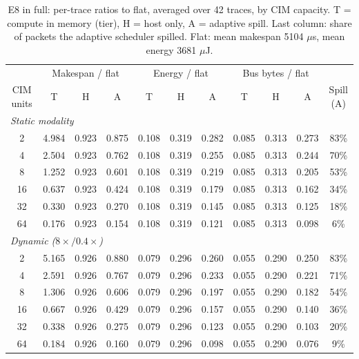 \begin{table}[h]
\centering\scriptsize\setlength{\tabcolsep}{3.2pt}
\caption{E8 in full: per-trace ratios to flat, averaged over 42 traces, by CIM capacity. T = compute in memory (tier), H = host only, A = adaptive spill. Last column: share of \warm{} packets the adaptive scheduler spilled. Flat: mean makespan 5104 $\mu$s, mean energy 3681 $\mu$J.}
\label{tab:e8full}
\begin{tabular}{c ccc ccc ccc c}
\toprule
 & \multicolumn{3}{c}{Makespan / flat} & \multicolumn{3}{c}{Energy / flat} & \multicolumn{3}{c}{Bus bytes / flat} & \\
\cmidrule(lr){2-4}\cmidrule(lr){5-7}\cmidrule(lr){8-10}
CIM units & T & H & A & T & H & A & T & H & A & Spill (A)\\
\midrule
\multicolumn{11}{l}{\textit{Static modality}}\\
2 & 4.984 & 0.923 & 0.875 & 0.108 & 0.319 & 0.282 & 0.085 & 0.313 & 0.273 & 83\%\\
4 & 2.504 & 0.923 & 0.762 & 0.108 & 0.319 & 0.255 & 0.085 & 0.313 & 0.244 & 70\%\\
8 & 1.252 & 0.923 & 0.601 & 0.108 & 0.319 & 0.219 & 0.085 & 0.313 & 0.205 & 53\%\\
16 & 0.637 & 0.923 & 0.424 & 0.108 & 0.319 & 0.179 & 0.085 & 0.313 & 0.162 & 34\%\\
32 & 0.330 & 0.923 & 0.270 & 0.108 & 0.319 & 0.145 & 0.085 & 0.313 & 0.125 & 18\%\\
64 & 0.176 & 0.923 & 0.154 & 0.108 & 0.319 & 0.121 & 0.085 & 0.313 & 0.098 & 6\%\\
\midrule
\multicolumn{11}{l}{\textit{Dynamic ($8\times/0.4\times$)}}\\
2 & 5.165 & 0.926 & 0.880 & 0.079 & 0.296 & 0.260 & 0.055 & 0.290 & 0.250 & 83\%\\
4 & 2.591 & 0.926 & 0.767 & 0.079 & 0.296 & 0.233 & 0.055 & 0.290 & 0.221 & 71\%\\
8 & 1.306 & 0.926 & 0.606 & 0.079 & 0.296 & 0.197 & 0.055 & 0.290 & 0.182 & 54\%\\
16 & 0.667 & 0.926 & 0.429 & 0.079 & 0.296 & 0.157 & 0.055 & 0.290 & 0.140 & 36\%\\
32 & 0.338 & 0.926 & 0.275 & 0.079 & 0.296 & 0.123 & 0.055 & 0.290 & 0.103 & 20\%\\
64 & 0.184 & 0.926 & 0.160 & 0.079 & 0.296 & 0.098 & 0.055 & 0.290 & 0.076 & 9\%\\
\bottomrule
\end{tabular}
\end{table}
